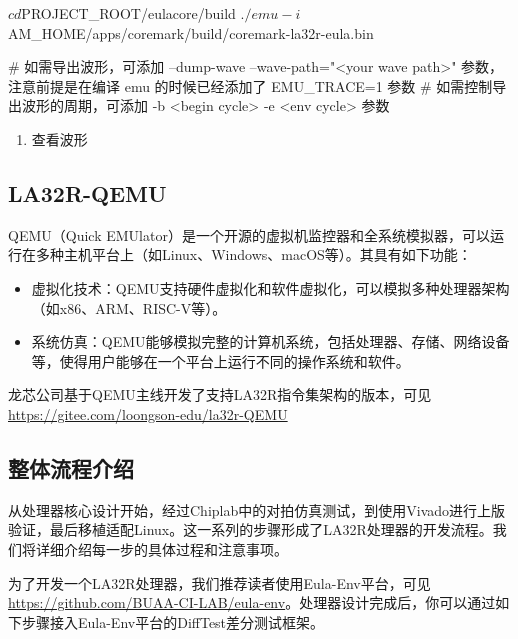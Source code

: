 \begin{CodeBlock}[language=BookShell]
$ cd ${PROJECT_ROOT}/eulacore/build
$ ./emu -i ${AM_HOME}/apps/coremark/build/coremark-la32r-eula.bin

# 如需导出波形，可添加 --dump-wave --wave-path="<your wave path>" 参数，注意前提是在编译 emu 的时候已经添加了 EMU_TRACE=1 参数
# 如需控制导出波形的周期，可添加 -b <begin cycle> -e <env cycle> 参数
\end{CodeBlock}

\begin{enumerate}
\def\labelenumi{\arabic{enumi}.}
\setcounter{enumi}{5}
\tightlist
\item
  查看波形
\end{enumerate}


\subsection{LA32R-QEMU}\label{sec:04-toolchain-013}

QEMU（Quick EMUlator）是一个开源的虚拟机监控器和全系统模拟器，可以运行在多种主机平台上（如Linux、Windows、macOS等）。其具有如下功能：

\begin{itemize}
\item
  虚拟化技术：QEMU支持硬件虚拟化和软件虚拟化，可以模拟多种处理器架构（如x86、ARM、RISC-V等）。
\item
  系统仿真：QEMU能够模拟完整的计算机系统，包括处理器、存储、网络设备等，使得用户能够在一个平台上运行不同的操作系统和软件。
\end{itemize}

龙芯公司基于QEMU主线开发了支持LA32R指令集架构的版本，可见\url{https://gitee.com/loongson-edu/la32r-QEMU}

\subsection{整体流程介绍}\label{sec:04-toolchain-014}

从处理器核心设计开始，经过Chiplab中的对拍仿真测试，到使用Vivado进行上版验证，最后移植适配Linux。这一系列的步骤形成了LA32R处理器的开发流程。我们将详细介绍每一步的具体过程和注意事项。

为了开发一个LA32R处理器，我们推荐读者使用Eula-Env平台，可见 \url{https://github.com/BUAA-CI-LAB/eula-env}。处理器设计完成后，你可以通过如下步骤接入Eula-Env平台的DiffTest差分测试框架。

